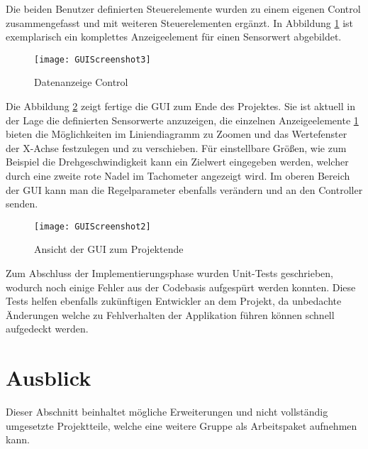 Die beiden Benutzer definierten Steuerelemente wurden zu einem eigenen Control zusammengefasst und mit weiteren Steuerelementen ergänzt. In Abbildung \ref{fig:control1} ist exemplarisch ein komplettes Anzeigeelement für einen Sensorwert abgebildet.

\begin{figure}[h]
	\centering
		\texttt{[image: GUIScreenshot3]}
		\caption{Datenanzeige Control}
		\label{fig:control1}
\end{figure}

Die Abbildung \ref{fig:guifinal} zeigt fertige die GUI zum Ende des Projektes. Sie ist aktuell in der Lage die definierten Sensorwerte anzuzeigen, die einzelnen Anzeigeelemente \ref{fig:control1} bieten die Möglichkeiten im Liniendiagramm zu Zoomen und das Wertefenster der X-Achse festzulegen und zu verschieben. Für einstellbare Größen, wie zum Beispiel die Drehgeschwindigkeit kann ein Zielwert eingegeben werden, welcher durch eine zweite rote Nadel im Tachometer angezeigt wird. Im oberen Bereich der GUI kann man die Regelparameter ebenfalls verändern und an den Controller senden.

\begin{figure}[h]
	\centering
		\texttt{[image: GUIScreenshot2]}
		\caption{Ansicht der GUI zum Projektende}
		\label{fig:guifinal}
\end{figure}

Zum Abschluss der Implementierungsphase wurden Unit-Tests geschrieben, wodurch noch einige Fehler aus der Codebasis aufgespürt werden konnten. Diese Tests helfen ebenfalls zukünftigen Entwickler an dem Projekt, da unbedachte Änderungen welche zu Fehlverhalten der Applikation führen können schnell aufgedeckt werden.

\section{Ausblick}
Dieser Abschnitt beinhaltet mögliche Erweiterungen und nicht vollständig umgesetzte Projektteile, welche eine weitere Gruppe als Arbeitspaket aufnehmen kann. 

